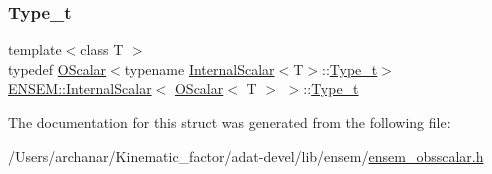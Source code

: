 \subsubsection{\texorpdfstring{Type\_t}{Type\_t}\hspace{0.1cm}{\footnotesize\ttfamily [3/3]}}
{\footnotesize\ttfamily template$<$class T $>$ \\
typedef \mbox{\hyperlink{classENSEM_1_1OScalar}{O\+Scalar}}$<$typename \mbox{\hyperlink{structENSEM_1_1InternalScalar}{Internal\+Scalar}}$<$T$>$\+::\mbox{\hyperlink{structENSEM_1_1InternalScalar_3_01OScalar_3_01T_01_4_01_4_a9d07cdf2267bf23524d55f3626782f7c}{Type\+\_\+t}}$>$ \mbox{\hyperlink{structENSEM_1_1InternalScalar}{E\+N\+S\+E\+M\+::\+Internal\+Scalar}}$<$ \mbox{\hyperlink{classENSEM_1_1OScalar}{O\+Scalar}}$<$ T $>$ $>$\+::\mbox{\hyperlink{structENSEM_1_1InternalScalar_3_01OScalar_3_01T_01_4_01_4_a9d07cdf2267bf23524d55f3626782f7c}{Type\+\_\+t}}}



The documentation for this struct was generated from the following file\+:\begin{DoxyCompactItemize}
\item 
/\+Users/archanar/\+Kinematic\+\_\+factor/adat-\/devel/lib/ensem/\mbox{\hyperlink{adat-devel_2lib_2ensem_2ensem__obsscalar_8h}{ensem\+\_\+obsscalar.\+h}}\end{DoxyCompactItemize}
